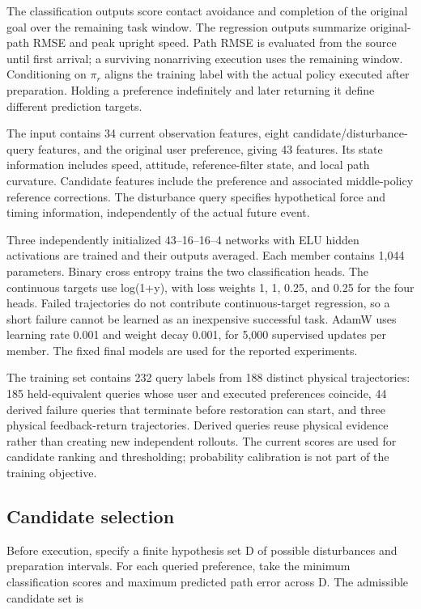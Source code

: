 \documentclass[journal]{IEEEtran}
\begin{document}
The classification outputs score contact avoidance and completion of the original goal over the remaining task window. The regression outputs summarize original-path RMSE and peak upright speed. Path RMSE is evaluated from the source until first arrival; a surviving nonarriving execution uses the remaining window. Conditioning on $\pi_r$ aligns the training label with the actual policy executed after preparation. Holding a preference indefinitely and later returning it define different prediction targets.


The input contains 34 current observation features, eight candidate/disturbance-query features, and the original user preference, giving 43 features. Its state information includes speed, attitude, reference-filter state, and local path curvature. Candidate features include the preference and associated middle-policy reference corrections. The disturbance query specifies hypothetical force and timing information, independently of the actual future event.


Three independently initialized 43--16--16--4 networks with ELU hidden activations are trained and their outputs averaged. Each member contains 1,044 parameters. Binary cross entropy trains the two classification heads. The continuous targets use log(1+y), with loss weights 1, 1, 0.25, and 0.25 for the four heads. Failed trajectories do not contribute continuous-target regression, so a short failure cannot be learned as an inexpensive successful task. AdamW uses learning rate 0.001 and weight decay 0.001, for 5,000 supervised updates per member. The fixed final models are used for the reported experiments.


The training set contains 232 query labels from 188 distinct physical trajectories: 185 held-equivalent queries whose user and executed preferences coincide, 44 derived failure queries that terminate before restoration can start, and three physical feedback-return trajectories. Derived queries reuse physical evidence rather than creating new independent rollouts. The current scores are used for candidate ranking and thresholding; probability calibration is not part of the training objective.


\subsection{Candidate selection}

Before execution, specify a finite hypothesis set D of possible disturbances and preparation intervals. For each queried preference, take the minimum classification scores and maximum predicted path error across D. The admissible candidate set is
\end{document}
